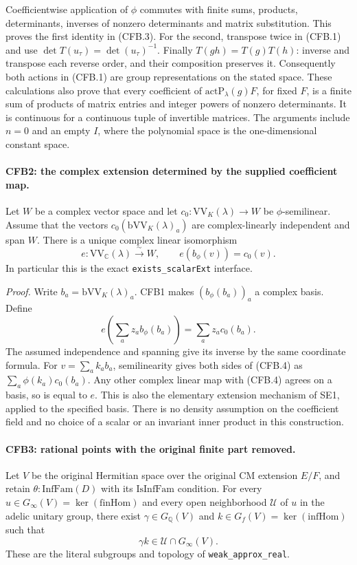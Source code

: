 Coefficientwise application of \(\phi\) commutes with finite sums,
products, determinants, inverses of nonzero determinants and matrix
substitution.  This proves the first identity in (CFB.3).
For the second, transpose twice in (CFB.1) and use
\(\det T(u_\tau)=\det(u_\tau)^{-1}\).
Finally \(T(gh)=T(g)T(h)\): inverse and transpose each reverse
order, and their composition preserves it.  Consequently both
actions in (CFB.1) are group representations on the stated space.
These calculations also prove that every coefficient of
\(\mathrm{actP}_\lambda(g)F\), for fixed \(F\), is a finite sum
of products of matrix entries and integer powers of nonzero
determinants.  It is continuous for a continuous tuple of invertible
matrices.  The arguments include \(n=0\) and an empty \(I\), where
the polynomial space is the one-dimensional constant space.

\paragraph{CFB2: the complex extension determined by the supplied coefficient map.}
\label{claim:CFB2}
Let \(W\) be a complex vector space and let
\(c_0:\mathrm{VV}_K(\lambda)\to W\) be \(\phi\)-semilinear.
Assume that the vectors
\(c_0(\mathrm{bVV}_K(\lambda)_a)\) are complex-linearly independent
and span \(W\).  There is a unique complex linear isomorphism
\[
 e:\mathrm{VV}_{\mathbb C}(\lambda)\xrightarrow{\ \sim\ }W,
 \qquad e(b_\phi(v))=c_0(v).                                  \tag{CFB.4}
\]
In particular this is the exact \texttt{exists\_scalarExt} interface.

\emph{Proof.}
Write \(b_a=\mathrm{bVV}_K(\lambda)_a\).  CFB1 makes
\((b_\phi(b_a))_a\) a complex basis.  Define
\[
 e\left(\sum_a z_a b_\phi(b_a)\right)=\sum_a z_a c_0(b_a).
                                                               \tag{CFB.5}
\]
The assumed independence and spanning give its inverse by the same
coordinate formula.  For \(v=\sum_a k_a b_a\), semilinearity gives
both sides of (CFB.4) as \(\sum_a\phi(k_a)c_0(b_a)\).
Any other complex linear map with (CFB.4) agrees on a basis, so is
equal to \(e\).  This is also the elementary extension mechanism of
SE1, applied to the specified basis.  There is no density assumption
on the coefficient field and no choice of a scalar or an invariant
inner product in this construction.

\paragraph{CFB3: rational points with the original finite part removed.}
\label{claim:CFB3}
Let \(V\) be the original Hermitian space over the original CM
extension \(E/F\), and retain \(\theta:\mathrm{InfFam}(D)\)
with its \(\mathrm{IsInfFam}\) condition.  For every
\(u\in G_\infty(V)=\ker(\mathrm{finHom})\) and every open
neighborhood \(\mathcal U\) of \(u\) in the adelic unitary group,
there exist \(\gamma\in G_{\mathbb Q}(V)\) and
\(k\in G_f(V)=\ker(\mathrm{infHom})\) such that
\[
             \gamma k\in\mathcal U\cap G_\infty(V).             \tag{CFB.6}
\]
These are the literal subgroups and topology of
\texttt{weak\_approx\_real}.

